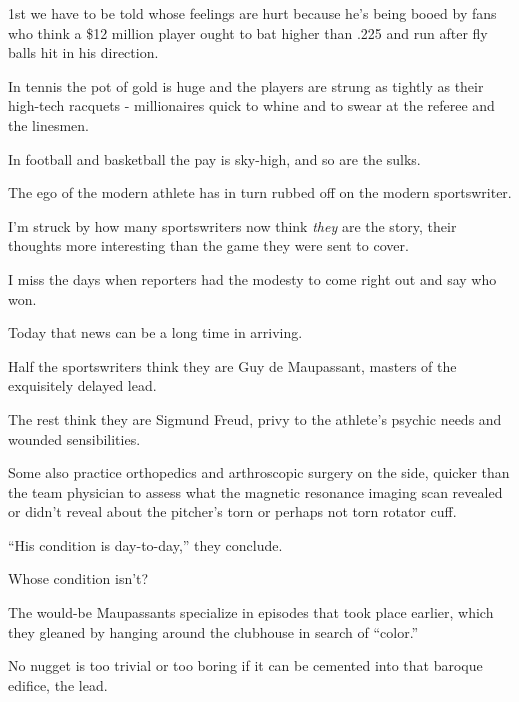 \documentclass{book}
\numberwithin{equation}{section}
\begin{document}
1st we have to be told whose feelings are hurt because he's being booed by fans who think a \$12 million player ought to bat higher than .225 and run after fly balls hit in his direction.

In tennis the pot of gold is huge and the players are strung as tightly as their high-tech racquets - millionaires quick to whine and to swear at the referee and the linesmen.

In football and basketball the pay is sky-high, and so are the sulks.

%
The ego of the modern athlete has in turn rubbed off on the modern sportswriter.

I'm struck by how many sportswriters now think \textit{they} are the story, their thoughts more interesting than the game they were sent to cover.

I miss the days when reporters had the modesty to come right out and say who won.

Today that news can be a long time in arriving.

Half the sportswriters think they are Guy de Maupassant, masters of the exquisitely delayed lead.

The rest think they are Sigmund Freud, privy to the athlete's psychic needs and wounded sensibilities.

Some also practice orthopedics and arthroscopic surgery on the side, quicker than the team physician to assess what the magnetic resonance imaging scan revealed or didn't reveal about the pitcher's torn or perhaps not torn rotator cuff.

``His condition is day-to-day,'' they conclude.

Whose condition isn't?

%
The would-be Maupassants specialize in episodes that took place earlier, which they gleaned by hanging around the clubhouse in search of ``color.''

No nugget is too trivial or too boring if it can be cemented into that baroque edifice, the lead.
\end{document}
